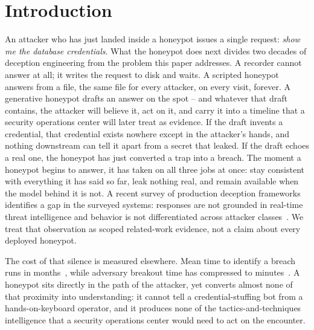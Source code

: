 \section{Introduction}
\label{sec:intro}

An attacker who has just landed inside a honeypot issues a single
request: \emph{show me the database credentials}. What the honeypot does
next divides two decades of deception engineering from the problem this
paper addresses. A recorder cannot answer at all; it writes the request
to disk and waits. A scripted honeypot answers from a file, the same file
for every attacker, on every visit, forever. A generative honeypot
drafts an answer on the spot -- and whatever that draft contains, the
attacker will believe it, act on it, and carry it into a timeline that a
security operations center will later treat as evidence. If the draft
invents a credential, that credential exists nowhere except in the
attacker's hands, and nothing downstream can tell it apart from a secret
that leaked. If the draft echoes a real one, the honeypot has just
converted a trap into a breach. The moment a honeypot begins to answer,
it has taken on all three jobs at once: stay consistent with everything
it has said so far, leak nothing real, and remain available when the
model behind it is not. A recent survey of production deception frameworks
identifies a gap in the surveyed systems: responses are not grounded in
real-time threat intelligence and behavior is not differentiated across
attacker classes~\cite{lopez2024}. We treat that observation as scoped
related-work evidence, not a claim about every deployed honeypot.

The cost of that silence is measured elsewhere. Mean time to identify a
breach runs in
months~\cite{ibm2024}, while adversary breakout time has compressed to
minutes~\cite{crowdstrike2026}. A honeypot sits directly in the path of the
attacker, yet converts almost none of that proximity into understanding: it
cannot tell a credential-stuffing bot from a hands-on-keyboard operator,
and it produces none of the
tactics-and-techniques intelligence that a security operations center would
need to act on the encounter.

